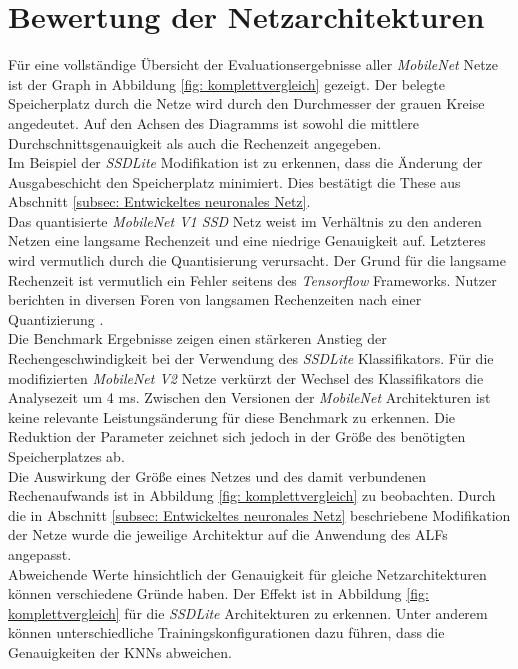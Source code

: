 \section{Bewertung der Netzarchitekturen}

Für eine vollständige Übersicht der Evaluationsergebnisse aller \textit{MobileNet} Netze ist der Graph in Abbildung \ref{fig: komplettvergleich} gezeigt. Der belegte Speicherplatz durch die Netze wird durch den Durchmesser der grauen Kreise angedeutet. Auf den Achsen des Diagramms ist sowohl die mittlere Durchschnittsgenauigkeit als auch die Rechenzeit angegeben.\\

Im Beispiel der \textit{SSDLite} Modifikation ist zu erkennen, dass die Änderung der Ausgabeschicht den Speicherplatz minimiert. Dies bestätigt die These aus Abschnitt \ref{subsec: Entwickeltes neuronales Netz}.\\

Das quantisierte \textit{MobileNet V1 SSD} Netz weist im Verhältnis zu den anderen Netzen eine langsame Rechenzeit und eine niedrige Genauigkeit auf. Letzteres wird vermutlich durch die Quantisierung verursacht. Der Grund für die langsame Rechenzeit ist vermutlich ein Fehler seitens des \textit{Tensorflow} Frameworks. Nutzer berichten in diversen Foren von langsamen Rechenzeiten nach einer Quantizierung \cite{quant}. \\

Die Benchmark Ergebnisse zeigen einen stärkeren Anstieg der Rechengeschwindigkeit bei der Verwendung des \textit{SSDLite} Klassifikators. Für die modifizierten \textit{MobileNet V2} Netze verkürzt der Wechsel des Klassifikators die Analysezeit um 4 ms. Zwischen den Versionen der \textit{MobileNet} Architekturen ist keine relevante Leistungsänderung für diese Benchmark zu erkennen. Die Reduktion der Parameter zeichnet sich jedoch in der Größe des benötigten Speicherplatzes ab.\\

Die Auswirkung der Größe eines Netzes und des damit verbundenen Rechenaufwands ist in Abbildung \ref{fig: komplettvergleich} zu beobachten. Durch die in Abschnitt \ref{subsec: Entwickeltes neuronales Netz} beschriebene Modifikation der Netze wurde die jeweilige Architektur auf die Anwendung des ALFs angepasst.\\





Abweichende Werte hinsichtlich der Genauigkeit für gleiche Netzarchitekturen können verschiedene Gründe haben. Der Effekt ist in Abbildung \ref{fig: komplettvergleich} für die \textit{SSDLite} Architekturen zu erkennen. Unter anderem können unterschiedliche Trainingskonfigurationen dazu führen, dass die Genauigkeiten der KNNs abweichen.\\

